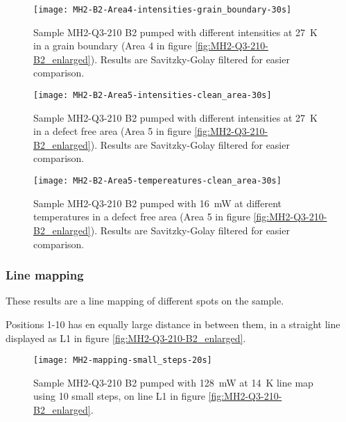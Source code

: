 \begin{figure}[H]
\centering
\texttt{[image: MH2-B2-Area4-intensities-grain\_boundary-30s]}
\caption[MH2-Q3-210 at area 4 with different intensities]{Sample MH2-Q3-210 B2 pumped with different intensities at 27~K in a grain boundary (Area 4 in figure \ref{fig:MH2-Q3-210-B2_enlarged}). Results are Savitzky-Golay filtered for easier comparison.}
\label{fig:MH2-B2-Area4-intensities-grain_boundary-30s}%
\end{figure}


\begin{figure}[H]
\centering
\texttt{[image: MH2-B2-Area5-intensities-clean\_area-30s]}
\caption[MH2-Q3-210 at area 5 with different intensities]{Sample MH2-Q3-210 B2 pumped with different intensities at 27~K in a defect free area (Area 5 in figure \ref{fig:MH2-Q3-210-B2_enlarged}). Results are Savitzky-Golay filtered for easier comparison.}
\label{fig:MH2-B2-Area5-intensities-clean_area-30s}%
\end{figure}


\begin{figure}[H]
\centering
\texttt{[image: MH2-B2-Area5-tempereatures-clean\_area-30s]}
\caption[MH2-Q3-210 at area 5 with different temperatures]{Sample MH2-Q3-210 B2 pumped with 16~mW at different temperatures in a defect free area (Area 5 in figure \ref{fig:MH2-Q3-210-B2_enlarged}). Results are Savitzky-Golay filtered for easier comparison.}
\label{fig:MH2-B2-Area5-tempereatures-clean_area-30s}%
\end{figure}



\subsubsection{Line mapping}

These results are a line mapping of different spots on the sample.

Positions 1-10 has en equally large distance in between them, in a straight line displayed as L1 in figure \ref{fig:MH2-Q3-210-B2_enlarged}.


\begin{figure}[H]
\centering
\texttt{[image: MH2-mapping-small\_steps-20s]}
\caption[MH2-Q3-210 line mapping]{Sample MH2-Q3-210 B2 pumped with 128~mW at 14~K line map using 10 small steps, on line L1 in figure \ref{fig:MH2-Q3-210-B2_enlarged}.}
\label{fig:MH2-mapping-small_steps-20s}%
\end{figure}



